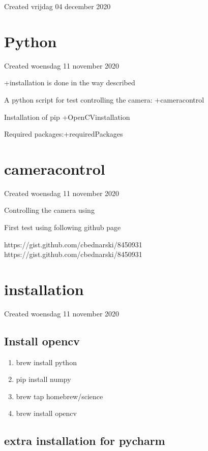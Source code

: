 \documentclass{article}
\begin{document}
Created vrijdag 04 december 2020




		\section{Python}

Created woensdag 11 november 2020



+installation is done in the way described



A python script for test controlling the camera: +cameracontrol



Installation of pip +OpenCVinstallation



Required packages:+requiredPackages


		\section{cameracontrol}

Created woensdag 11 november 2020



Controlling the camera using



First test using following github page

https://gist.github.com/cbednarski/8450931 https://gist.github.com/cbednarski/8450931


		\section{installation}

Created woensdag 11 november 2020



\subsection{Install opencv}

\begin{enumerate}[1]
\item brew install python
\item pip install numpy
\item brew tap homebrew/science
\item brew install opencv
\end{enumerate}


\subsection{extra installation for pycharm}
\end{document}
